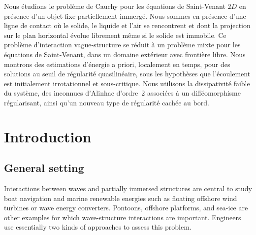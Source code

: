 \documentclass[JEP,XML,SOM,Unicode,NoFloatCountersInSection,published]{cedram}
\theoremstyle{definition}
\begin{document}



\begin{altabstract}
Nous étudions le problème de Cauchy pour les équations de Saint-Venant $2D$ en présence d'un objet fixe partiellement immergé. Nous sommes en présence d'une ligne de contact où le solide, le liquide et l'air se rencontrent et dont la projection sur le plan horizontal évolue librement même si le solide est immobile. Ce problème d'interaction vague-structure se réduit à un problème mixte pour les équations de Saint-Venant, dans un domaine extérieur avec frontière libre. Nous montrons des estimations d'énergie a priori, localement en temps, pour des solutions au seuil de régularité quasilinéaire, sous les hypothèses que l'écoulement est initialement irrotationnel et sous-critique. Nous utilisons la dissipativité faible du système, des inconnues d'Alinhac d'ordre~$2$ associées à un difféomorphisme régularisant, ainsi qu'un nouveau type de régularité cachée au bord.
\end{altabstract}

\maketitle
\vspace*{-\baselineskip}
\tableofcontents


\section{Introduction}
\subsection{General setting}
Interactions between waves and partially immersed structures are central to study boat navigation and marine renewable energies
such as floating offshore wind turbines or wave energy converters.
Pontoons, offshore platforms, and sea-ice are other examples for which wave-structure interactions are important.
Engineers use essentially two kinds of approaches to assess this problem.
\end{document}
